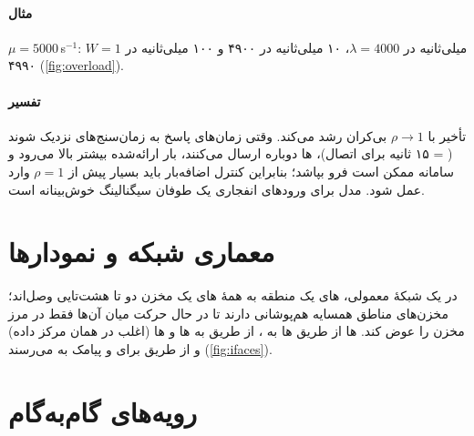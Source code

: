 \documentclass[11pt,a4paper]{article}
\begin{document}
\paragraph{مثال} $\mu = 5000$\,s$^{-1}$: $W = 1$ میلی‌ثانیه در $\lambda = 4000$، ۱۰ میلی‌ثانیه در ۴۹۰۰ و ۱۰۰ میلی‌ثانیه در
۴۹۹۰ (\cref{fig:overload}).
\paragraph{تفسیر} تأخیر با $\rho\to1$ بی‌کران رشد می‌کند. وقتی زمان‌های پاسخ به زمان‌سنج‌های  نزدیک شوند
( = ۱۵ ثانیه برای اتصال)، ها دوباره ارسال می‌کنند، بار ارائه‌شده بیشتر بالا می‌رود و سامانه ممکن است
فرو بپاشد؛ بنابراین کنترل اضافه‌بار باید بسیار پیش از $\rho = 1$ وارد عمل شود. مدل  برای ورودهای انفجاری یک
طوفان سیگنالینگ خوش‌بینانه است.

\begin{acnfigure}
  \caption{میانگین زمان پاسخ یک پردازندهٔ سیگنالینگ  بر حسب بار (\cref{eq:mm1}).}
  \label{fig:overload}
\end{acnfigure}

\section{معماری شبکه و نمودارها}
در یک شبکهٔ معمولی، های یک منطقه به همهٔ های یک مخزن دو تا هشت‌تایی وصل‌اند؛ مخزن‌های مناطق
همسایه هم‌پوشانی دارند تا  در حال حرکت میان آن‌ها فقط در مرز مخزن  را عوض کند. ها از طریق
ها به ، از طریق  به ها و ها (اغلب در همان مرکز داده) و از طریق 
برای  و پیامک به  می‌رسند (\cref{fig:ifaces}).

\section{رویه‌های گام‌به‌گام}
\end{document}
